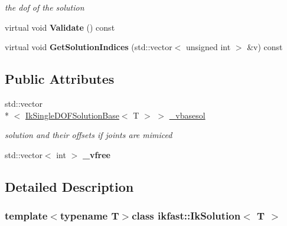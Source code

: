 \begin{DoxyCompactItemize}
\begin{DoxyCompactList}\small\item\em the dof of the solution \end{DoxyCompactList}\item 
\hypertarget{classikfast_1_1IkSolution_ad61847499fe76751629f70047f8b0a69}{virtual void {\bfseries Validate} () const }\label{classikfast_1_1IkSolution_ad61847499fe76751629f70047f8b0a69}

\item 
\hypertarget{classikfast_1_1IkSolution_ae6b77cab94b40369712a099cc21d42e8}{virtual void {\bfseries Get\-Solution\-Indices} (std\-::vector$<$ unsigned int $>$ \&v) const }\label{classikfast_1_1IkSolution_ae6b77cab94b40369712a099cc21d42e8}

\end{DoxyCompactItemize}
\subsection*{Public Attributes}
\begin{DoxyCompactItemize}
\item 
\hypertarget{classikfast_1_1IkSolution_ac1b4c9612cee58a2b98388454b1054d7}{std\-::vector\\*
$<$ \hyperlink{classikfast_1_1IkSingleDOFSolutionBase}{Ik\-Single\-D\-O\-F\-Solution\-Base}$<$ T $>$ $>$ \hyperlink{classikfast_1_1IkSolution_ac1b4c9612cee58a2b98388454b1054d7}{\-\_\-vbasesol}}\label{classikfast_1_1IkSolution_ac1b4c9612cee58a2b98388454b1054d7}

\begin{DoxyCompactList}\small\item\em solution and their offsets if joints are mimiced \end{DoxyCompactList}\item 
\hypertarget{classikfast_1_1IkSolution_a3c552543a66e39e127bed5a5c085b1bb}{std\-::vector$<$ int $>$ {\bfseries \-\_\-vfree}}\label{classikfast_1_1IkSolution_a3c552543a66e39e127bed5a5c085b1bb}

\end{DoxyCompactItemize}


\subsection{Detailed Description}
\subsubsection*{template$<$typename T$>$class ikfast\-::\-Ik\-Solution$<$ T $>$}

